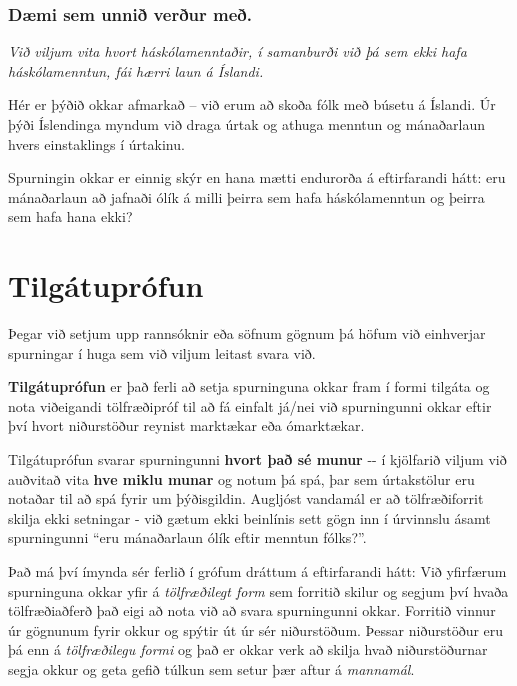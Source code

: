 \documentclass[
]{book}
\begin{document}
\hypertarget{duxe6mi-sem-unniuxf0-veruxf0ur-meuxf0.}{%
\subsection*{Dæmi sem unnið verður með.}\label{duxe6mi-sem-unniuxf0-veruxf0ur-meuxf0.}}

\emph{Við viljum vita hvort háskólamenntaðir, í samanburði við þá sem ekki
hafa háskólamenntun, fái hærri laun á Íslandi.}

Hér er þýðið okkar afmarkað -- við erum að skoða fólk með búsetu á
Íslandi. Úr þýði Íslendinga myndum við draga úrtak og athuga menntun og
mánaðarlaun hvers einstaklings í úrtakinu.

Spurningin okkar er einnig skýr en hana mætti endurorða á eftirfarandi
hátt: eru mánaðarlaun að jafnaði ólík á milli þeirra sem hafa
háskólamenntun og þeirra sem hafa hana ekki?

\hypertarget{tilguxe1tupruxf3fun}{%
\chapter{Tilgátuprófun}\label{tilguxe1tupruxf3fun}}

Þegar við setjum upp rannsóknir eða söfnum gögnum þá höfum við
einhverjar spurningar í huga sem við viljum leitast svara við.

\textbf{Tilgátuprófun} er það ferli að setja spurninguna okkar fram í formi
tilgáta og nota viðeigandi tölfræðipróf til að fá einfalt já/nei við
spurningunni okkar eftir því hvort niðurstöður reynist marktækar eða
ómarktækar.

Tilgátuprófun svarar spurningunni \textbf{hvort það sé munur} -\/- í kjölfarið
viljum við auðvitað vita \textbf{hve miklu munar} og notum þá spá, þar sem
úrtakstölur eru notaðar til að spá fyrir um þýðisgildin. Augljóst
vandamál er að tölfræðiforrit skilja ekki setningar - við gætum ekki
beinlínis sett gögn inn í úrvinnslu ásamt spurningunni ``eru mánaðarlaun
ólík eftir menntun fólks?''.

Það má því ímynda sér ferlið í grófum dráttum á eftirfarandi hátt: Við
yfirfærum spurninguna okkar yfir á \emph{tölfræðilegt form} sem forritið
skilur og segjum því hvaða tölfræðiaðferð það eigi að nota við að svara
spurningunni okkar. Forritið vinnur úr gögnunum fyrir okkur og spýtir út
úr sér niðurstöðum. Þessar niðurstöður eru þá enn á \emph{tölfræðilegu formi}
og það er okkar verk að skilja hvað niðurstöðurnar segja okkur og geta
gefið túlkun sem setur þær aftur á \emph{mannamál}.
\end{document}
